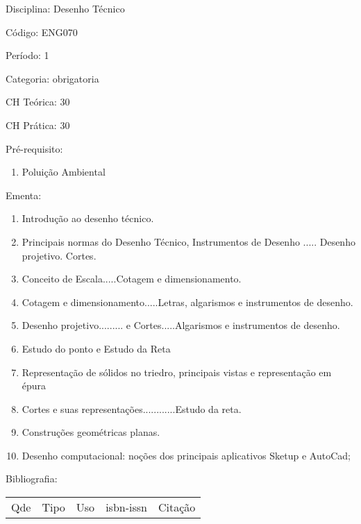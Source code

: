 \documentclass[12pt,a4paper,twoside]{report}
\begin{document}
Disciplina: Desenho Técnico

Código: ENG070

Período: 1

Categoria: obrigatoria

CH Teórica: 30

CH Prática: 30




Pré-requisito:
\begin{enumerate}
\item Poluição Ambiental
\end{enumerate}

Ementa:
\begin{enumerate}
\item Introdução ao desenho técnico.
\item Principais normas do Desenho Técnico, Instrumentos de Desenho ..... Desenho projetivo. Cortes.
\item Conceito de Escala.....Cotagem e dimensionamento.
\item Cotagem e dimensionamento.....Letras, algarismos e instrumentos de desenho.
\item Desenho projetivo......... e Cortes.....Algarismos e instrumentos de desenho.
\item Estudo do ponto e Estudo da Reta
\item Representação de sólidos no triedro, principais vistas e representação em épura
\item Cortes e suas representações............Estudo da reta.
\item Construções geométricas planas.
\item Desenho computacional: noções dos principais aplicativos Sketup e AutoCad;
\end{enumerate}



Bibliografia:


\begin{tabular}{llllp{8cm}}
Qde & Tipo & Uso & isbn-issn & Citação \\
\end{tabular}
\end{document}
